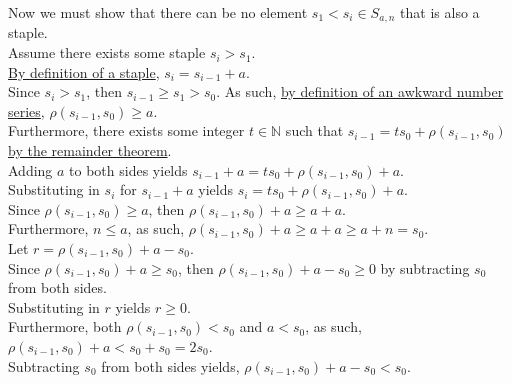 \documentclass[a4paper,12pt]{article}
\begin{document}
\noindent Now we must show that there can be no element $s_1 < s_i \in S_{a, n}$ that is also a staple.\\

\noindent Assume there exists some staple $s_i > s_1$.\\

\noindent \hyperlink{definition:staple}{By definition of a staple}, $s_i = s_{i - 1} + a$.\\

\noindent Since $s_i > s_1$, then $s_{i - 1} \geq s_1 > s_0$. As such, \hyperlink{definition:awkward_number_series}{by definition of an awkward number series}, $\rho(s_{i - 1}, s_0) \geq a$.\\

\noindent Furthermore, there exists some integer $t \in \mathbb{N}$ such that $s_{i - 1} = ts_0 + \rho(s_{i - 1}, s_0)$ \hyperlink{theorem:remainder_theorem}{by the remainder theorem}.\\

\noindent Adding $a$ to both sides yields $s_{i - 1} + a = ts_0 + \rho(s_{i - 1}, s_0) + a$.\\

\noindent Substituting in $s_i$ for $s_{i - 1} + a$ yields $s_i = ts_0 + \rho(s_{i - 1}, s_0) + a$.\\

\noindent Since $\rho(s_{i - 1}, s_0) \geq a$, then $\rho(s_{i - 1}, s_0) + a \geq a + a$.\\

\noindent Furthermore, $n \leq a$, as such, $\rho(s_{i - 1}, s_0) + a \geq a + a \geq a + n = s_0$.\\

\noindent Let $r = \rho(s_{i - 1}, s_0) + a - s_0$.\\

\noindent Since $\rho(s_{i - 1}, s_0) + a \geq s_0$, then $\rho(s_{i - 1}, s_0) + a - s_0 \geq 0$ by subtracting $s_0$ from both sides.\\

\noindent Substituting in $r$ yields $r \geq 0$.\\

\noindent Furthermore, both $\rho(s_{i - 1}, s_0) < s_0$ and $a < s_0$, as such,\\ $\rho(s_{i - 1}, s_0) + a < s_0 + s_0 = 2s_0$.\\

\noindent Subtracting $s_0$ from both sides yields, $\rho(s_{i - 1}, s_0) + a - s_0 < s_0$.\\
\end{document}
